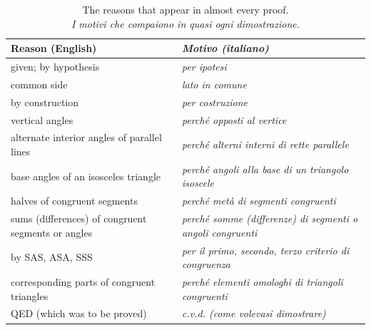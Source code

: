 \documentclass[10pt,a4paper,oneside]{book}
\newcommand{\bicap}[2]{\caption{#1\\{\color{itgreen}\itshape #2}}}
\begin{document}
\begin{table}[htbp]
\centering
\small
\begin{tabularx}{\textwidth}{@{}>{\raggedright\arraybackslash}X >{\raggedright\arraybackslash\itshape\leavevmode\color{itgreen}}X@{}}
\toprule
\textbf{Reason (English)} & \textbf{\upshape Motivo (italiano)}\\
\midrule
given; by hypothesis & per ipotesi\\
common side & lato in comune\\
by construction & per costruzione\\
vertical angles & perché opposti al vertice\\
alternate interior angles of parallel lines & perché alterni interni di rette parallele\\
base angles of an isosceles triangle & perché angoli alla base di un triangolo isoscele\\
halves of congruent segments & perché metà di segmenti congruenti\\
sums (differences) of congruent segments or angles & perché somme (differenze) di segmenti o angoli congruenti\\
by SAS, ASA, SSS & per il primo, secondo, terzo criterio di congruenza\\
corresponding parts of congruent triangles & perché elementi omologhi di triangoli congruenti\\
QED (which was to be proved) & c.v.d. (come volevasi dimostrare)\\
\bottomrule
\end{tabularx}
\bicap{The reasons that appear in almost every proof.}{I motivi che compaiono in quasi ogni dimostrazione.}
\label{tab:phrases}
\end{table}
\end{document}
